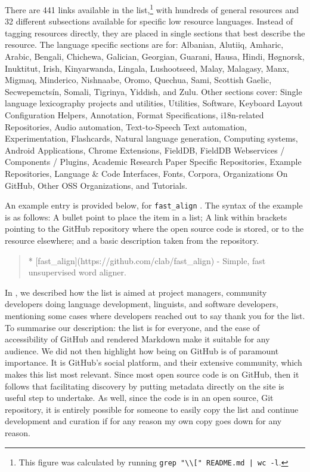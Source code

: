 There are 441 links available in the list,\footnote{This figure was calculated by running \texttt{grep "\textbackslash* \textbackslash[" README.md | wc -l}.} with hundreds of general resources and 32 different subsections available for specific low resource languages. Instead of tagging resources directly, they are placed in single sections that best describe the resource. The language specific sections are for: Albanian, Alutiiq, Amharic, Arabic, Bengali, Chichewa, Galician, Georgian, Guarani, Hausa, Hindi, H\o gnorsk, Inuktitut, Irish, Kinyarwanda, Lingala, Lushootseed, Malay, Malagasy, Manx, Migmaq, Minderico, Nishnaabe, Oromo, Quechua, Sami, Scottish Gaelic, Secwepemcts\'in, Somali, Tigrinya, Yiddish, and Zulu. Other sections cover: Single language lexicography projects and utilities, Utilities, Software, Keyboard Layout Configuration Helpers, Annotation, Format Specifications, i18n-related Repositories, Audio automation, Text-to-Speech
Text automation, Experimentation, Flashcards, Natural language generation, Computing systems, Android Applications, Chrome Extensions, FieldDB, FieldDB Webservices / Components / Plugins, Academic Research Paper Specific Repositories, Example Repositories, Language \& Code Interfaces, Fonts, Corpora, Organizations On GitHub, Other OSS Organizations, and Tutorials.

An example entry is provided below, for {\tt fast\_align} \citep{dyer2013simple}. The syntax of the example is as follows: A bullet point to place the item in a list; A link within brackets pointing to the GitHub repository where the open source code is stored, or to the resource elsewhere; and a basic description taken from the repository.

\begin{quote}
* [fast\_align](https://github.com/clab/fast\_align) - Simple, fast unsupervised word aligner.
\end{quote}

In \citet{CCURL}, we described how the list is aimed at project managers, community developers doing language development, linguists, and software developers, mentioning some cases where developers reached out to say thank you for the list. To summarise our description: the list is for everyone, and the ease of accessibility of GitHub and rendered Markdown make it suitable for any audience. We did not then highlight how being on GitHub is of paramount importance. It is GitHub's social platform, and their extensive community, which makes this list most relevant. Since most open source code is on GitHub, then it follows that facilitating discovery by putting metadata directly on the site is useful step to undertake. As well, since the code is in an open source, Git repository, it is entirely possible for someone to easily copy the list and continue development and curation if for any reason my own copy goes down for any reason.

